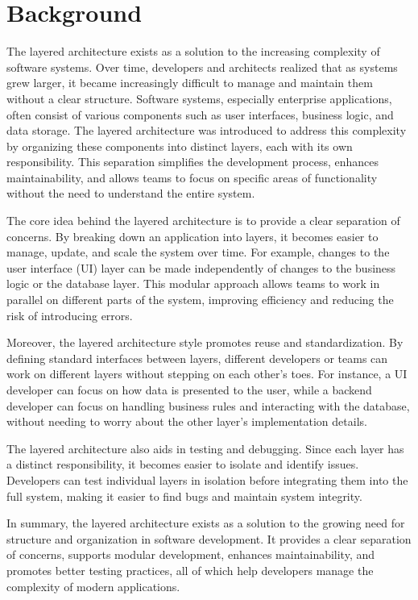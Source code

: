 \section{Background}

The layered architecture exists as a solution to the increasing complexity of software systems. Over time, developers and architects realized that as systems grew larger, it became increasingly difficult to manage and maintain them without a clear structure. Software systems, especially enterprise applications, often consist of various components such as user interfaces, business logic, and data storage. The layered architecture was introduced to address this complexity by organizing these components into distinct layers, each with its own responsibility. This separation simplifies the development process, enhances maintainability, and allows teams to focus on specific areas of functionality without the need to understand the entire system.

The core idea behind the layered architecture is to provide a clear separation of concerns. By breaking down an application into layers, it becomes easier to manage, update, and scale the system over time. For example, changes to the user interface (UI) layer can be made independently of changes to the business logic or the database layer. This modular approach allows teams to work in parallel on different parts of the system, improving efficiency and reducing the risk of introducing errors.

Moreover, the layered architecture style promotes reuse and standardization. By defining standard interfaces between layers, different developers or teams can work on different layers without stepping on each other’s toes. For instance, a UI developer can focus on how data is presented to the user, while a backend developer can focus on handling business rules and interacting with the database, without needing to worry about the other layer's implementation details.

The layered architecture also aids in testing and debugging. Since each layer has a distinct responsibility, it becomes easier to isolate and identify issues. Developers can test individual layers in isolation before integrating them into the full system, making it easier to find bugs and maintain system integrity.

In summary, the layered architecture exists as a solution to the growing need for structure and organization in software development. It provides a clear separation of concerns, supports modular development, enhances maintainability, and promotes better testing practices, all of which help developers manage the complexity of modern applications.

